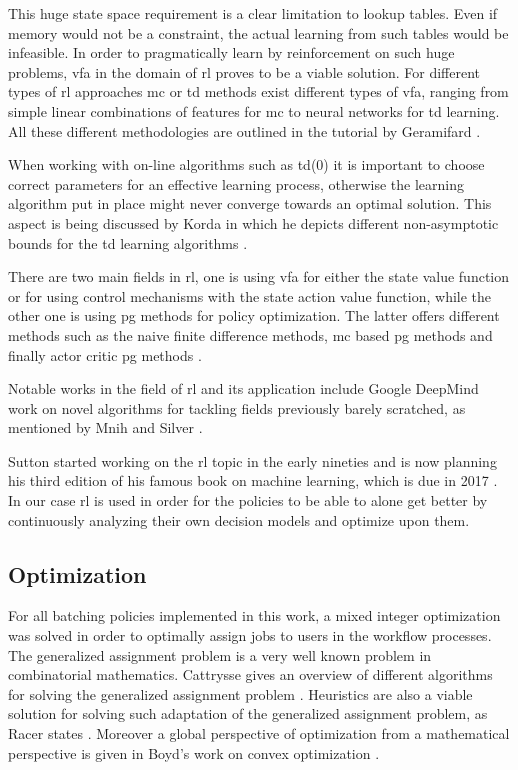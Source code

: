 \documentclass{seal_thesis}
\begin{document}
This huge state space requirement is a clear limitation to lookup tables. Even if memory would not be a constraint, the actual learning from such tables would be infeasible. In order to pragmatically learn by reinforcement on such huge problems, \gls{vfa} in the domain of \gls{rl} proves to be a viable solution. For different types of \gls{rl} approaches \ie \gls{mc} or \gls{td} methods exist different types of \gls{vfa}, ranging from simple linear combinations of features for \gls{mc} to neural networks for \gls{td} learning. All these different methodologies are outlined in the tutorial by Geramifard \cite{Geramifard2013}.

When working with on-line algorithms such as \gls{td}(0) it is important to choose correct parameters for an effective learning process, otherwise the learning algorithm put in place might never converge towards an optimal solution. This aspect is being discussed by Korda in which he depicts different non-asymptotic bounds for the \gls{td} learning algorithms \cite{Korda2014}.

There are two main fields in \gls{rl}, one is using \gls{vfa} for either the state value function or for using control mechanisms with the state action value function, while the other one is using \gls{pg} methods for policy optimization. The latter offers different methods such as the naive finite difference methods, \gls{mc} based \gls{pg} methods and finally actor critic \gls{pg} methods \cite{Silver2014}.

Notable works in the field of \gls{rl} and its application include Google DeepMind work on novel algorithms for tackling fields previously barely scratched, as mentioned by Mnih \etal and Silver \etal \cite{Mnih2015,Silver2016}.

Sutton started working on the \gls{rl} topic in the early nineties and is now planning his third edition of his famous book on machine learning, which is due in 2017 \cite{Sutton2017}. In our case \gls{rl} is used in order for the policies to be able to alone get better by continuously analyzing their own decision models and optimize upon them.

\subsection{Optimization}

For all batching policies implemented in this work, a mixed integer optimization was solved in order to optimally assign jobs to users in the workflow processes. The generalized assignment problem is a very well known problem in combinatorial mathematics. Cattrysse gives an overview of different algorithms for solving the generalized assignment problem \cite{Cattrysse1992}. Heuristics are also a viable solution for solving such adaptation of the generalized assignment problem, as Racer states \cite{Racer1994}. Moreover a global perspective of optimization from a mathematical perspective is given in Boyd's work on convex optimization \cite{Boyd2004}.
\end{document}
